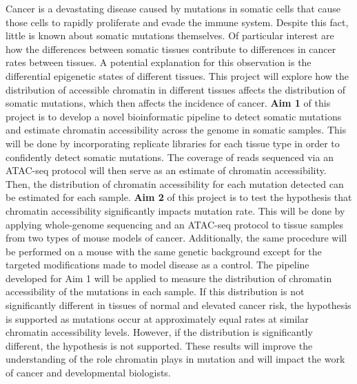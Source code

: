 Cancer is a devastating disease caused by mutations in somatic cells that cause those cells to rapidly proliferate and evade the immune system.
Despite this fact, little is known about somatic mutations themselves.
Of particular interest are how the differences between somatic tissues contribute to differences in cancer rates between tissues.
A potential explanation for this observation is the differential epigenetic states of different tissues.
This project will explore how the distribution of accessible chromatin in different tissues affects the distribution of somatic mutations, which then affects the incidence of cancer.
\textbf{Aim 1} of this project is to develop a novel bioinformatic pipeline to detect somatic mutations and estimate chromatin accessibility across the genome in somatic samples.
This will be done by incorporating replicate libraries for each tissue type in order to confidently detect somatic mutations.
The coverage of reads sequenced via an ATAC-seq protocol will then serve as an estimate of chromatin accessibility.
Then, the distribution of chromatin accessibility for each mutation detected can be estimated for each sample.
\textbf{Aim 2} of this project is to test the hypothesis that chromatin accessibility significantly impacts mutation rate.
This will be done by applying whole-genome sequencing and an ATAC-seq protocol to tissue samples from two types of mouse models of cancer.
Additionally, the same procedure will be performed on a mouse with the same genetic background except for the targeted modifications made to model disease as a control.
The pipeline developed for Aim 1 will be applied to measure the distribution of chromatin accessibility of the mutations in each sample.
If this distribution is not significantly different in tissues of normal and elevated cancer risk, the hypothesis is supported as mutations occur at approximately equal rates at similar chromatin accessibility levels.
However, if the distribution is significantly different, the hypothesis is not supported.
These results will improve the understanding of the role chromatin plays in mutation and will impact the work of cancer and developmental biologists.
